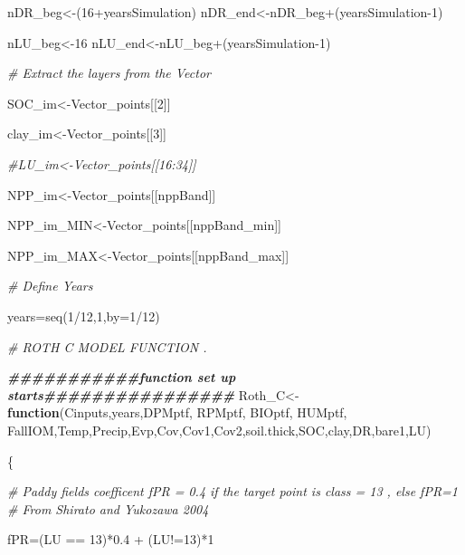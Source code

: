 \documentclass[
  10pt,
  b5paper,
]{book}
\newenvironment{Shaded}{\begin{snugshade}}{\end{snugshade}}
\newcommand{\AttributeTok}[1]{\textcolor[rgb]{0.77,0.63,0.00}{#1}}
\newcommand{\CommentTok}[1]{\textcolor[rgb]{0.56,0.35,0.01}{\textit{#1}}}
\newcommand{\ControlFlowTok}[1]{\textcolor[rgb]{0.13,0.29,0.53}{\textbf{#1}}}
\newcommand{\DecValTok}[1]{\textcolor[rgb]{0.00,0.00,0.81}{#1}}
\newcommand{\DocumentationTok}[1]{\textcolor[rgb]{0.56,0.35,0.01}{\textbf{\textit{#1}}}}
\newcommand{\FloatTok}[1]{\textcolor[rgb]{0.00,0.00,0.81}{#1}}
\newcommand{\FunctionTok}[1]{\textcolor[rgb]{0.00,0.00,0.00}{#1}}
\newcommand{\NormalTok}[1]{#1}
\newcommand{\OtherTok}[1]{\textcolor[rgb]{0.56,0.35,0.01}{#1}}
\newcommand{\SpecialCharTok}[1]{\textcolor[rgb]{0.00,0.00,0.00}{#1}}
\begin{document}
\begin{Shaded}
\begin{Highlighting}[]
\NormalTok{nDR\_beg}\OtherTok{\textless{}{-}}\NormalTok{(}\DecValTok{16}\SpecialCharTok{+}\NormalTok{yearsSimulation)}
\NormalTok{nDR\_end}\OtherTok{\textless{}{-}}\NormalTok{nDR\_beg}\SpecialCharTok{+}\NormalTok{(yearsSimulation}\DecValTok{{-}1}\NormalTok{)}

\NormalTok{nLU\_beg}\OtherTok{\textless{}{-}}\DecValTok{16}
\NormalTok{nLU\_end}\OtherTok{\textless{}{-}}\NormalTok{nLU\_beg}\SpecialCharTok{+}\NormalTok{(yearsSimulation}\DecValTok{{-}1}\NormalTok{)}

\CommentTok{\# Extract the layers from the Vector}

\NormalTok{SOC\_im}\OtherTok{\textless{}{-}}\NormalTok{Vector\_points[[}\DecValTok{2}\NormalTok{]] }

\NormalTok{clay\_im}\OtherTok{\textless{}{-}}\NormalTok{Vector\_points[[}\DecValTok{3}\NormalTok{]] }

\CommentTok{\#LU\_im\textless{}{-}Vector\_points[[16:34]]}

\NormalTok{NPP\_im}\OtherTok{\textless{}{-}}\NormalTok{Vector\_points[[nppBand]]}

\NormalTok{NPP\_im\_MIN}\OtherTok{\textless{}{-}}\NormalTok{Vector\_points[[nppBand\_min]]}

\NormalTok{NPP\_im\_MAX}\OtherTok{\textless{}{-}}\NormalTok{Vector\_points[[nppBand\_max]]}

\CommentTok{\# Define Years}

\NormalTok{years}\OtherTok{=}\FunctionTok{seq}\NormalTok{(}\DecValTok{1}\SpecialCharTok{/}\DecValTok{12}\NormalTok{,}\DecValTok{1}\NormalTok{,}\AttributeTok{by=}\DecValTok{1}\SpecialCharTok{/}\DecValTok{12}\NormalTok{)}


\CommentTok{\# ROTH C MODEL FUNCTION . }

\DocumentationTok{\#\#\#\#\#\#\#\#\#\#\#function set up starts\#\#\#\#\#\#\#\#\#\#\#\#\#\#\#\#}
\NormalTok{Roth\_C}\OtherTok{\textless{}{-}}\ControlFlowTok{function}\NormalTok{(Cinputs,years,DPMptf, RPMptf, BIOptf, HUMptf, FallIOM,Temp,Precip,Evp,Cov,Cov1,Cov2,soil.thick,SOC,clay,DR,bare1,LU)}

\NormalTok{\{}

\CommentTok{\# Paddy fields coefficent fPR = 0.4 if the target point is class = 13 , else fPR=1}
\CommentTok{\# From Shirato and Yukozawa 2004}

\NormalTok{fPR}\OtherTok{=}\NormalTok{(LU }\SpecialCharTok{==} \DecValTok{13}\NormalTok{)}\SpecialCharTok{*}\FloatTok{0.4} \SpecialCharTok{+}\NormalTok{ (LU}\SpecialCharTok{!=}\DecValTok{13}\NormalTok{)}\SpecialCharTok{*}\DecValTok{1}


\end{Highlighting}
\end{Shaded}
\end{document}

